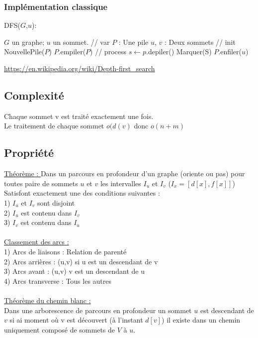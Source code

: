 \documentclass{article}
\begin{document}
\subsubsection{Implémentation classique}
\begin{algorithm}
\caption{DFS($G$,$u$):}
\begin{algorithmic}
\REQUIRE $G$ un graphe; $u$ un sommet. 
\STATE // var
\STATE $P$ : Une pile
\STATE $u$, $v$ : Deux sommets 
\STATE // init 
\STATE NouvellePile($P$)
\STATE $P$.empiler($P$)
\STATE // process
\STATE $s \leftarrow p$.depiler()
\STATE Marquer(S)
\STATE $P$.enfiler($u$)
\ENDFOR
\ENDIF
\ENDWHILE
\end{algorithmic}
\end{algorithm}
\url{https://en.wikipedia.org/wiki/Depth-first_search}
\subsection{Complexité}
Chaque sommet v est traité exactement une fois. \\
Le traitement de chaque sommet $o(d(v)$ donc $o(n+m)$
\subsection{Propriété}
\underline{Théorème : }
 Dans un parcours en profondeur d’un graphe (oriente ou pas) pour toutes paire de sommets $u$ et $v$ les intervalles $I_u$ et $I_v$ ($I_x=[d[x],f[x]]$) \\
 Satisfont exactement une des conditions suivantes : \\
1) $I_u$ et $I_v$ sont disjoint \\
2) $I_u$ est contenu dans $I_v$ \\
3) $I_v$ est contenu dans $I_u$ \\
 \\
 \underline {Classement des arcs : } \\
1) Arcs de liaisons : Relation de parenté \\
2) Arcs arrières : (u,v) si u est un descendant de v \\
3) Arcs avant : (u,v) v est un descendant de u \\
4) Arcs transverse : Tous les autres \\
\\
\underline{ Théorème du chemin blanc : } \\
Dans une arborescence de parcours en profondeur un sommet $u$ est descendant de $v$ si ai moment où v est découvert (à l’instant $d[v]$) il existe dans un chemin uniquement composé de sommets de $V$ à $u$. \\

 
\end{document}
